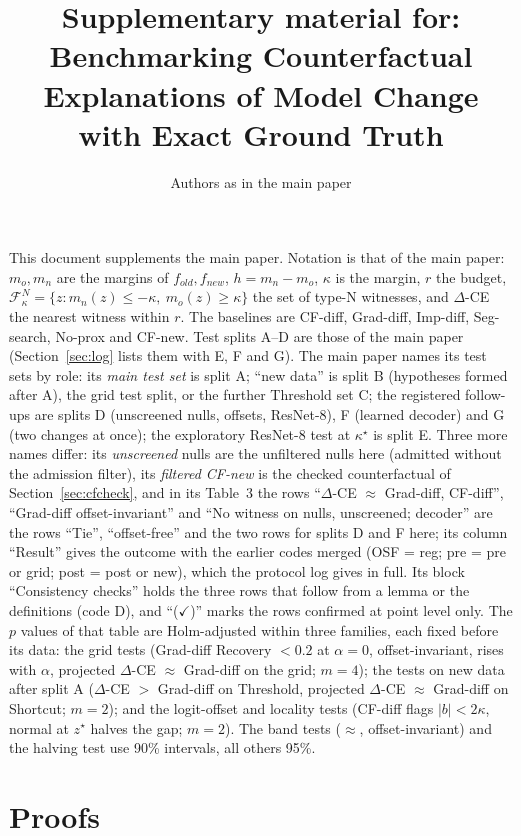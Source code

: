 \documentclass[10pt,a4paper]{article}
\title{Supplementary material for:\\Benchmarking Counterfactual Explanations of Model Change\\with Exact Ground Truth}
\author{Authors as in the main paper}
\date{}
\theoremstyle{remark}
\newcommand{\F}{\mathcal F^N_\kappa}
\newcommand{\DCE}{$\Delta$-CE}
\begin{document}
\maketitle

\noindent This document supplements the main paper. Notation is that of the main paper: $m_o,m_n$ are the margins of $f_{old},f_{new}$, $h=m_n-m_o$, $\kappa$ is the margin, $r$ the budget, $\F=\{z:m_n(z)\le-\kappa,\ m_o(z)\ge\kappa\}$ the set of type-N witnesses, and \DCE{} the nearest witness within $r$. The baselines are CF-diff, Grad-diff, Imp-diff, Seg-search, No-prox and CF-new. Test splits A--D are those of the main paper (Section~\ref{sec:log} lists them with E, F and G). The main paper names its test sets by role: its \emph{main test set} is split A; ``new data'' is split B (hypotheses formed after A), the grid test split, or the further Threshold set C; the registered follow-ups are splits D (unscreened nulls, offsets, ResNet-8), F (learned decoder) and G (two changes at once); the exploratory ResNet-8 test at $\kappa^\star$ is split E. Three more names differ: its \emph{unscreened} nulls are the unfiltered nulls here (admitted without the admission filter), its \emph{filtered CF-new} is the checked counterfactual of Section~\ref{sec:cfcheck}, and in its Table~3 the rows ``$\Delta$-CE $\approx$ Grad-diff, CF-diff'', ``Grad-diff offset-invariant'' and ``No witness on nulls, unscreened; decoder'' are the rows ``Tie'', ``offset-free'' and the two rows for splits D and F here; its column ``Result'' gives the outcome with the earlier codes merged (OSF = reg; pre = pre or grid; post = post or new), which the protocol log gives in full. Its block ``Consistency checks'' holds the three rows that follow from a lemma or the definitions (code D), and ``($\checkmark$)'' marks the rows confirmed at point level only. The $p$ values of that table are Holm-adjusted within three families, each fixed before its data: the grid tests (Grad-diff Recovery $<0.2$ at $\alpha=0$, offset-invariant, rises with $\alpha$, projected $\Delta$-CE $\approx$ Grad-diff on the grid; $m=4$); the tests on new data after split A ($\Delta$-CE $>$ Grad-diff on Threshold, projected $\Delta$-CE $\approx$ Grad-diff on Shortcut; $m=2$); and the logit-offset and locality tests (CF-diff flags $|b|<2\kappa$, normal at $z^\star$ halves the gap; $m=2$). The band tests ($\approx$, offset-invariant) and the halving test use 90\% intervals, all others 95\%.

\section{Proofs}\label{sec:proofs}
\end{document}

